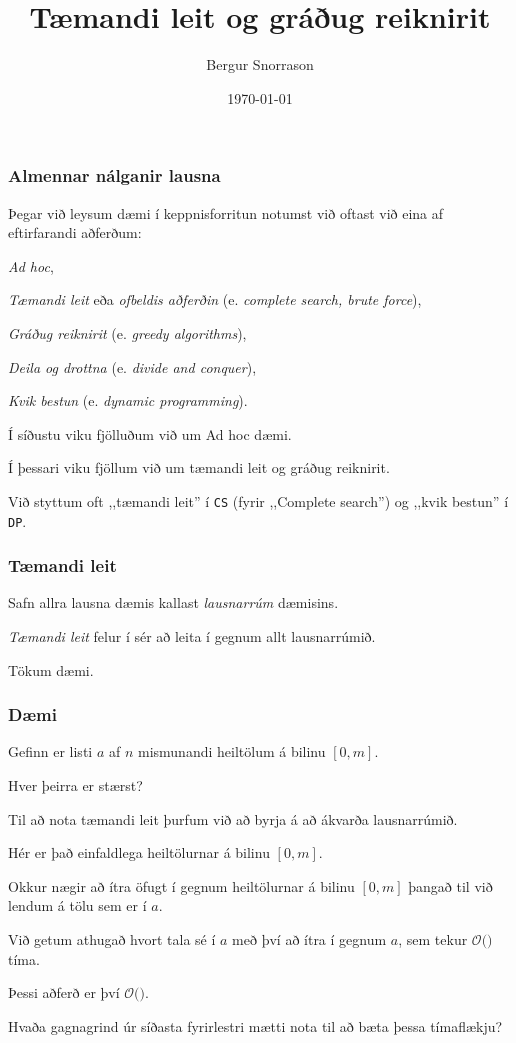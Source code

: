 \title{Tæmandi leit og gráðug reiknirit}
\author{Bergur Snorrason}
\date{\today}



\frame{\titlepage}

{
	\frametitle{Almennar nálganir lausna}
	{
		\item<1-> Þegar við leysum dæmi í keppnisforritun notumst við oftast við eina af eftirfarandi aðferðum:
		{
			\item<2-> \emph{Ad hoc},
			\item<3-> \emph{Tæmandi leit} eða \emph{ofbeldis aðferðin} (e. \emph{complete search, brute force}),
			\item<4-> \emph{Gráðug reiknirit} (e. \emph{greedy algorithms}),
			\item<5-> \emph{Deila og drottna} (e. \emph{divide and conquer}),
			\item<6-> \emph{Kvik bestun} (e. \emph{dynamic programming}).
		}
		\item<7-> Í síðustu viku fjölluðum við um Ad hoc dæmi.
		\item<8-> Í þessari viku fjöllum við um tæmandi leit og gráðug reiknirit.
		\item<9-> Við styttum oft ,,tæmandi leit'' í \texttt{CS} (fyrir ,,Complete search'') og ,,kvik bestun'' í \texttt{DP}.
	}
}

{
	\frametitle{Tæmandi leit}
	{
		\item<1-> Safn allra lausna dæmis kallast \emph{lausnarrúm} dæmisins.
		\item<2-> \emph{Tæmandi leit} felur í sér að leita í gegnum allt lausnarrúmið.
		\item<3-> Tökum dæmi.
	}
}

{
	\frametitle{Dæmi}
	{
		\item<1-> Gefinn er listi $a$ af $n$ mismunandi heiltölum á bilinu $[0, m]$.
		\item<2-> Hver þeirra er stærst?
		\item<3-> Til að nota tæmandi leit þurfum við að byrja á að ákvarða lausnarrúmið.
		\item<4-> Hér er það einfaldlega heiltölurnar á bilinu $[0, m]$.
		\item<5-> Okkur nægir að ítra öfugt í gegnum heiltölurnar á bilinu $[0, m]$ þangað til við lendum á tölu sem er í $a$.
		\item<6-> Við getum athugað hvort tala sé í $a$ með því að ítra í gegnum $a$, sem tekur $\mathcal{O}($$)$ tíma.
		\item<8-> Þessi aðferð er því $\mathcal{O}($\onslide<9->{$nm$}$)$.
		\item<10-> Hvaða gagnagrind úr síðasta fyrirlestri mætti nota til að bæta þessa tímaflækju?
	}
}

